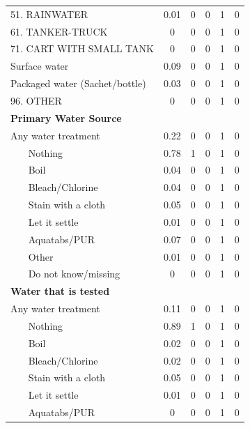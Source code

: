\begin{table}[htbp]
\begin{tabular}{l*{5}{c}}
51. RAINWATER       &        0.01&        0&        0&        1&        0\\
61. TANKER-TRUCK    &        0&        0&        0&        1&        0\\
71. CART WITH SMALL TANK&        0&        0&        0&        1&        0\\
Surface water       &        0.09&        0&        0&        1&        0\\
Packaged water (Sachet/bottle)&        0.03&        0&        0&        1&        0\\
96. OTHER           &        0&        0&        0&        1&        0\\
\textbf{Primary Water Source} \\\hline Any water treatment&        0.22&        0&        0&        1&        0\\
~~~ Nothing      &        0.78&        1&        0&        1&        0\\
~~~ Boil         &        0.04&        0&        0&        1&        0\\
~~~ Bleach/Chlorine&        0.04&        0&        0&        1&        0\\
~~~ Stain with a cloth&        0.05&        0&        0&        1&        0\\
~~~ Let it settle&        0.01&        0&        0&        1&        0\\
~~~ Aquatabs/PUR &        0.07&        0&        0&        1&        0\\
~~~ Other        &        0.01&        0&        0&        1&        0\\
~~~ Do not know/missing&        0&        0&        0&        1&        0\\
\textbf{Water that is tested} \\\hline Any water treatment&        0.11&        0&        0&        1&        0\\
~~~ Nothing      &        0.89&        1&        0&        1&        0\\
~~~ Boil         &        0.02&        0&        0&        1&        0\\
~~~ Bleach/Chlorine&        0.02&        0&        0&        1&        0\\
~~~ Stain with a cloth&        0.05&        0&        0&        1&        0\\
~~~ Let it settle&        0.01&        0&        0&        1&        0\\
~~~ Aquatabs/PUR &        0&        0&        0&        1&        0\\

\end{tabular}
\end{table}
